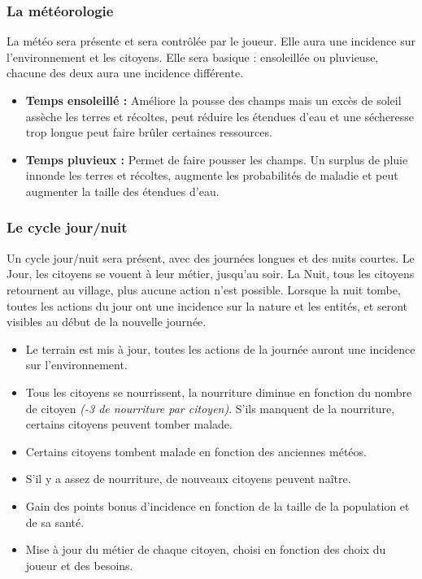 \documentclass[a4paper]{article}
\newcommand{\alinea}{\hspace*{0.5cm}}
\begin{document}
        \subsubsection{La météorologie}
          \alinea La météo sera présente et sera contrôlée par le joueur. Elle aura une incidence sur l'environnement et les citoyens. Elle sera basique : ensoleillée ou pluvieuse, chacune des deux aura une incidence différente. 
          \begin{itemize} \small
            \item \textbf{Temps ensoleillé :} Améliore la pousse des champs mais un excès de soleil assèche les terres et récoltes, peut réduire les étendues d'eau et une sécheresse trop longue peut faire brûler certaines ressources.
            \item \textbf{Temps pluvieux :} Permet de faire pousser les champs. Un surplus de pluie innonde les terres et récoltes, augmente les probabilités de maladie et peut augmenter la taille des étendues d'eau.
          \end{itemize} \normalsize


        \subsubsection{Le cycle jour/nuit}
          \label{Cycle}
          \alinea Un cycle jour/nuit sera présent, avec des journées longues et des nuits courtes. Le Jour, les citoyens se vouent à leur métier, jusqu'au soir. La Nuit, tous les citoyens retournent au village, plus aucune action n'est possible. Lorsque la nuit tombe, toutes les actions du jour ont une incidence sur la nature et les entités, et seront visibles au début de la nouvelle journée.
          \begin{itemize} \small
            \item Le terrain est mis à jour, toutes les actions de la journée auront une incidence sur l'environnement.
            \item Tous les citoyens se nourrissent, la nourriture diminue en fonction du nombre de citoyen \textit{(-3 de nourriture par citoyen)}. S'ils manquent de la nourriture, certains citoyens peuvent tomber malade.
            \item Certains citoyens tombent malade en fonction des anciennes météos.
            \item S'il y a assez de nourriture, de nouveaux citoyens peuvent naître.
            \item Gain des points bonus d'incidence en fonction de la taille de la population et de sa santé.
            \item Mise à jour du métier de chaque citoyen, choisi en fonction des choix du joueur et des besoins.
          \end{itemize} \normalsize
\end{document}
